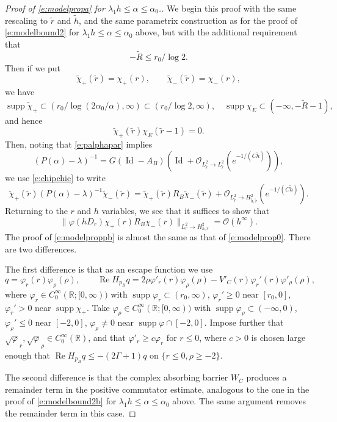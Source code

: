 \documentclass[reqno, 12pt]{amsart}
\newcommand \R {\mathbb{R}}
\newcommand \Oh {\mathcal{O}}
\DeclareMathOperator \re {Re}
\DeclareMathOperator \supp {supp}
\DeclareMathOperator \Id {Id}
\theoremstyle{definition}
\numberwithin{equation}{section}
\numberwithin{prop}{section}
\numberwithin{figure}{section}
\begin{document}
\begin{proof}[Proof of \eqref{e:modelpropa} for $\lambda_1 h \le \alpha \le \alpha_0$.] We begin this proof with the same rescaling to $\tilde r$ and $\tilde h$, and the same parametrix construction as for the proof of \eqref{e:modelbound2}  for $\lambda_1 h \le \alpha \le \alpha_0$ above, but with the additional requirement that
\[
-\widetilde R \le r_0/\log 2.
\]
Then if we put
\[
\widetilde \chi_+(\tilde r) = \chi_+(r), \qquad \widetilde \chi_-(\tilde r) = \chi_-(r),
\]
we have 
\[
\supp \widetilde \chi_+ \subset (r_0/\log(2\alpha_0/\alpha),\infty) \subset (r_0/\log2,\infty), \quad \supp \chi_E \subset (-\infty,-\widetilde R -1) ,
\]
 and hence
\begin{equation}\label{e:chipchie}
\widetilde\chi_+(\tilde r) \chi_E(\tilde r -1 )=0.
\end{equation}
Then, noting that \eqref{e:palphapar} implies
\[
(P(\alpha)-\lambda)^{-1} = G(\Id-A_B)(\Id + \Oh_{L^2_{\tilde r} \to L^2_{\tilde r} }(e^{-1/(C\tilde h)})),
\]
we use \eqref{e:chipchie} to write
\[
\widetilde\chi_+(\tilde r)(P(\alpha)-\lambda)^{-1} \widetilde\chi_-(\tilde r) = \widetilde\chi_+(\tilde r) R_B \widetilde\chi_-(\tilde r) + \Oh_{L^2_{\tilde r} \to H^2_{\tilde h, \tilde r} }(e^{-1/(C\tilde h)}). 
\]
Returning to the $r$ and $h$ variables, we see that  it suffices to show that
\begin{equation}\label{e:modelproppb}
\|\varphi(h D_{ r}) \chi_+( r) R_B\chi_-( r)\|_{L^2_{ r} \to H^2_{ h,  r}} = \Oh( h^\infty).
\end{equation}
The proof of \eqref{e:modelproppb} is almost the same as that of \eqref{e:modelprop0}. There are two differences.

The first difference is that as an escape function we use
\[
q = \varphi_r( r)\varphi_\rho( \rho), \qquad 
\re H_{p_B} q= 
2 \rho\varphi'_r( r)\varphi_\rho( \rho) -  V'_C( r) \varphi_r'( r)\varphi'_\rho( \rho),
\]
where $\varphi_r \in C_0^\infty(\R;[0,\infty))$ with $\supp \varphi_r \subset (r_0,\infty)$, $\varphi_r' \ge 0$ near $[r_0,0]$, $\varphi_r' > 0$ near $\supp \chi_+$. Take $\varphi_\rho \in C_0^\infty(\R;[0,\infty))$ with $\supp \varphi_\rho \subset (-\infty,0)$, $\varphi_\rho' \le 0$ near $[-2,0]$, $\varphi_\rho \ne 0$ near $\supp \varphi \cap [-2,0]$.  Impose further that $\sqrt\varphi_r, \sqrt\varphi_\rho \in C_0^\infty(\R)$, and that $\varphi'_r \ge c \varphi_r$ for $r \le 0$, where $c >0$ is chosen large enough that $\re H_{p_B} q \le -(2\Gamma +1)q$ on $\{r \le 0, \rho \ge -2\}$. 

The second difference is that the complex absorbing barrier $W_C$ produces a remainder term in the positive commutator estimate, analogous to the one in the proof of  \eqref{e:modelbound2b} for $\lambda_1 h \le \alpha \le \alpha_0$ above. The same argument removes the remainder term in this case.
\end{proof}
\end{document}
